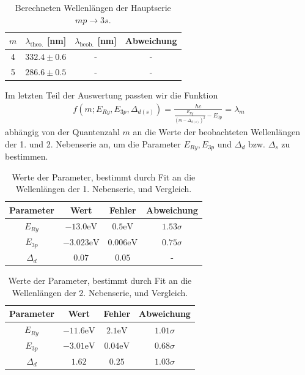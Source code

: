\begin{table}[H]
  \centering
  \caption{Berechneten Wellenlängen der Hauptserie $mp \to 3s$.}
  \vspace*{0.5em}
  \begin{tabular}{c c c c}
      \hline
      $m$ & $\lambda_{\text{theo.}}$ [nm] & $\lambda_{\text{beob.}}$ [nm] & Abweichung \\
      \hline
      4  & $332.4 \pm 0.6$ & -     & -     \\
      5  & $286.6 \pm 0.5$  & - & - \\
      \hline
  \end{tabular}
  \label{tab:wellenlaengen_hs_zsfm}
\end{table}

Im letzten Teil der Auswertung passten wir die Funktion
\begin{align}
  f(m;E_{Ry}, E_{3p}, \Delta_{d(s)}) = \frac{hc}{\frac{E_{Ry}}{(m - \Delta_{d(s)})^2} - E_{3p}} = \lambda_m
\end{align}
abhängig von der Quantenzahl $m$ an die Werte der beobachteten Wellenlängen der 1. und 2. Nebenserie an, um die Parameter $E_{Ry}, E_{3p}$ und $\Delta_{d}$ bzw. $\Delta_{s}$ zu bestimmen.


\begin{table}[H]
  \centering
  \caption{Werte der Parameter, bestimmt durch Fit an die Wellenlängen der 1. Nebenserie, und Vergleich.}
  \vspace*{0.5em}
  \begin{tabular}{c c c c}
      \hline
      Parameter & Wert & Fehler & Abweichung \\
      \hline
      $E_{Ry}$  & $-13.0 \si{\electronvolt}$ & $0.5\si{\electronvolt}$ & $1.53\sigma$ \\
      $E_{3p}$  & $-3.023\si{\electronvolt}$  & $0.006\si{\electronvolt}$ & $0.75\sigma$ \\
      $\Delta_{d}$  & $0.07$  & $0.05$ & - \\
      \hline
  \end{tabular}
  \label{tab:fit_1ns_vergl}
\end{table}


\begin{table}[H]
  \centering
  \caption{Werte der Parameter, bestimmt durch Fit an die Wellenlängen der 2. Nebenserie, und Vergleich.}
  \vspace*{0.5em}
  \begin{tabular}{c c c c}
      \hline
      Parameter & Wert & Fehler & Abweichung \\
      \hline
      $E_{Ry}$  & $-11.6 \si{\electronvolt}$ & $2.1\si{\electronvolt}$ & $1.01\sigma$ \\
      $E_{3p}$  & $-3.01\si{\electronvolt}$  & $0.04\si{\electronvolt}$ & $0.68\sigma$ \\
      $\Delta_{d}$  & $1.62$  & $0.25$ & $1.03\sigma$ \\
      \hline
  \end{tabular}
  \label{tab:fit_2ns_vergl}
\end{table}